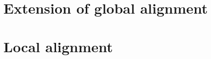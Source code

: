 \documentclass[12pt]{article}
\begin{document}
\section{Extension of global alignment}






\newpage

%
%
\setcounter{figure}{0}
\setcounter{table}{0}
\section{Local alignment}



\end{document}
